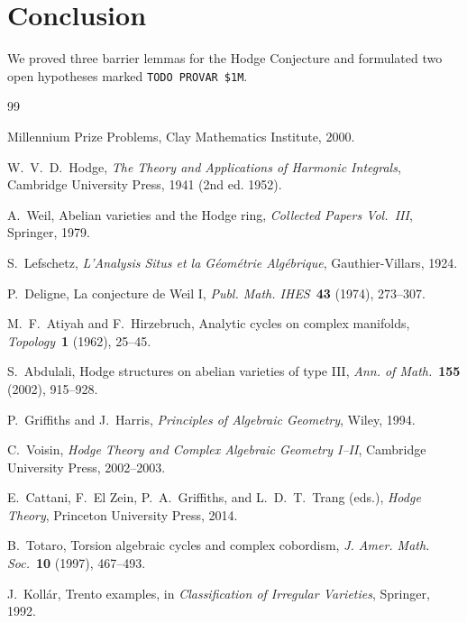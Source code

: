 \documentclass[12pt]{article}
\theoremstyle{plain}
\theoremstyle{definition}
\begin{document}
\section{Conclusion}

We proved three barrier lemmas for the Hodge Conjecture and formulated
two open hypotheses marked \texttt{TODO PROVAR \$1M}.


\begin{thebibliography}{99}

Millennium Prize Problems, Clay Mathematics Institute, 2000.

W.~V.~D.~Hodge,
\emph{The Theory and Applications of Harmonic Integrals},
Cambridge University Press, 1941 (2nd ed. 1952).

A.~Weil,
Abelian varieties and the Hodge ring,
\emph{Collected Papers Vol.~III}, Springer, 1979.

S.~Lefschetz,
\emph{L'Analysis Situs et la G\'eom\'etrie Alg\'ebrique},
Gauthier-Villars, 1924.

P.~Deligne,
La conjecture de Weil I,
\emph{Publ. Math. IHES}\ \textbf{43} (1974), 273--307.

M.~F.~Atiyah and F.~Hirzebruch,
Analytic cycles on complex manifolds,
\emph{Topology}\ \textbf{1} (1962), 25--45.

S.~Abdulali,
Hodge structures on abelian varieties of type III,
\emph{Ann. of Math.}\ \textbf{155} (2002), 915--928.

P.~Griffiths and J.~Harris,
\emph{Principles of Algebraic Geometry},
Wiley, 1994.

C.~Voisin,
\emph{Hodge Theory and Complex Algebraic Geometry I--II},
Cambridge University Press, 2002--2003.

E.~Cattani, F.~El Zein, P.~A.~Griffiths, and L.~D.~T.~Trang (eds.),
\emph{Hodge Theory},
Princeton University Press, 2014.

B.~Totaro,
Torsion algebraic cycles and complex cobordism,
\emph{J. Amer. Math. Soc.}\ \textbf{10} (1997), 467--493.

J.~Koll\'ar,
Trento examples,
in \emph{Classification of Irregular Varieties}, Springer, 1992.


\end{thebibliography}
\end{document}
